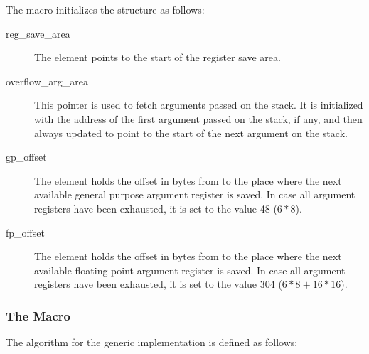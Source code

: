 The  macro initializes the structure as follows:

\begin{description}
\item [reg_save_area]
The element points to the start of the register save area.
\item [overflow_arg_area] This pointer is used to fetch arguments
  passed on the stack.  It is initialized with the address of the
  first argument passed on the stack, if any, and then always updated
  to point to the start of the next argument on the stack.
\item [gp_offset] The element holds the offset in bytes from
   to the place where the next available general
  purpose argument register is saved.  In case all argument registers
  have been exhausted, it is set to the value 48 ($6*8$).
\item [fp_offset]
The element holds the offset in bytes from  to the
place where the next available floating point
argument register is saved.  In case all argument registers have been exhausted,
it is set to the value 304 ($6*8+16*16$).
\end{description}

\subsubsection{The  Macro}

The algorithm for the generic  implementation is
defined as follows:

